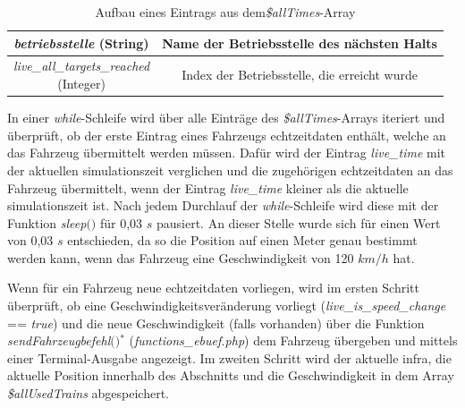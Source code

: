 \begin{table}
\begin{center}
\begin{tabular}{c|c}
\textit{betriebsstelle} (String)                  		&    Name der Betriebsstelle des nächsten Halts                \\ \hline
\makecell{\textit{live\_all\_targets\_reached}\\(Integer)}                  		&    Index der Betriebsstelle, die erreicht wurde                \\ 
\end{tabular}
\renewcommand{\arraystretch}{1}
\caption{Aufbau eines Eintrags aus dem\textit{\$allTimes}-Array}
\label{table:aufbauAllTimes}
\end{center}
\end{table}
In einer \textit{while}-Schleife wird über alle Einträge des \textit{\$allTimes}-Arrays iteriert und überprüft, ob der erste Eintrag eines Fahrzeugs \Gls{echtzeitdaten} enthält, welche an das Fahrzeug übermittelt werden müssen. Dafür wird der Eintrag \textit{live\_time} mit der aktuellen \Gls{simulationszeit} verglichen und die zugehörigen  \Gls{echtzeitdaten} an das Fahrzeug übermittelt, wenn der Eintrag \textit{live\_time} kleiner als die aktuelle \Gls{simulationszeit} ist. Nach jedem Durchlauf der \textit{while}-Schleife wird diese mit der Funktion \textit{sleep$($$)$} für 0,03 $s$ pausiert. An dieser Stelle wurde sich für einen Wert von 0,03 $s$ entschieden, da so die Position auf einen Meter genau bestimmt werden kann, wenn das Fahrzeug eine Geschwindigkeit von 120 $km/h$ hat.

Wenn für ein Fahrzeug neue \Gls{echtzeitdaten} vorliegen, wird im ersten Schritt überprüft, ob eine Geschwindigkeitsveränderung vorliegt (\textit{live\_is\_speed\_change} == \textit{true}) und die neue Geschwindigkeit (falls vorhanden) über die Funktion \textit{sendFahrzeugbefehl$($$)$}$^\ast$ (\textit{functions\_ebuef.php}) dem Fahrzeug übergeben und mittels einer Terminal-Ausgabe angezeigt. Im zweiten Schritt wird der aktuelle \ac{infra}, die aktuelle Position innerhalb des Abschnitts und die Geschwindigkeit in dem Array \textit{\$allUsedTrains} abgespeichert. 

